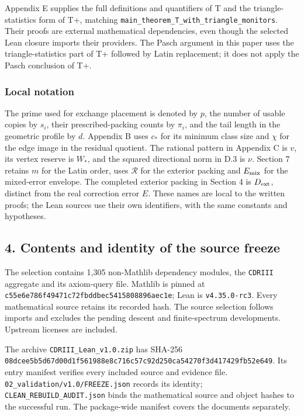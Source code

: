 \documentclass[english,11pt,a4paper]{article}
\begin{document}
Appendix E supplies the full definitions and quantifiers of T and the triangle-statistics form of T+, matching \texttt{main\_\allowbreak{}theorem\_\allowbreak{}T\_\allowbreak{}with\_\allowbreak{}triangle\_\allowbreak{}monitors}. Their proofs are external mathematical dependencies, even though the selected Lean closure imports their providers. The Pasch argument in this paper uses the triangle-statistics part of T+ followed by Latin replacement; it does not apply the Pasch conclusion of T+.

\subsubsection{Local notation}\label{local-notation}

The prime used for exchange placement is denoted by \(p\), the number of usable copies by \(s_i\), their prescribed-packing counts by \(\pi_i\), and the tail length in the geometric profile by \(d\). Appendix B uses \(c_\ast\) for its minimum class size and \(\chi\) for the edge image in the residual quotient. The rational pattern in Appendix C is \(v\), its vertex reserve is \(W_\ast\), and the squared directional norm in D.3 is \(\nu\). Section 7 retains \(m\) for the Latin order, uses \(\mathcal R\) for the exterior packing and \(E_{\rm mix}\) for the mixed-error envelope. The completed exterior packing in Section 4 is \(D_{\rm ext}\), distinct from the real correction error \(E\). These names are local to the written proofs; the Lean sources use their own identifiers, with the same constants and hypotheses.

\subsection{4. Contents and identity of the source freeze}\label{contents-and-identity-of-the-source-freeze}

The selection contains 1,305 non-Mathlib dependency modules, the \texttt{CDRIII} aggregate and its axiom-query file. Mathlib is pinned at \texttt{c55e6e78\allowbreak{}6f49471c\allowbreak{}72fbddbe\allowbreak{}c5415808\allowbreak{}896aec1e}; Lean is \texttt{v4.\allowbreak{}35.\allowbreak{}0-rc3}. Every mathematical source retains its recorded hash. The source selection follows imports and excludes the pending descent and finite-spectrum developments. Upstream licenses are included.

The archive \texttt{CDRIII\_\allowbreak{}Lean\_\allowbreak{}v1.\allowbreak{}0.\allowbreak{}zip} has SHA-256 \texttt{08dcee5b\allowbreak{}5d67d00d\allowbreak{}1f561988\allowbreak{}e8c716c5\allowbreak{}7c92d250\allowbreak{}ca54270f\allowbreak{}3d417429\allowbreak{}fb52e649}. Its entry manifest verifies every included source and evidence file. \texttt{02\_\allowbreak{}validation/\allowbreak{}v1.\allowbreak{}0/\allowbreak{}FREEZE.\allowbreak{}json} records its identity; \texttt{CLEAN\_\allowbreak{}REBUILD\_\allowbreak{}AUDIT.\allowbreak{}json} binds the mathematical source and object hashes to the successful run. The package-wide manifest covers the documents separately.
\end{document}
